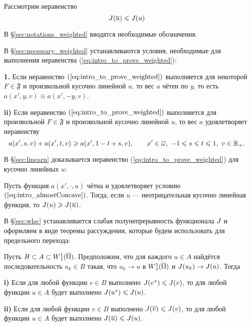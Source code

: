 Рассмотрим неравенство
\begin{equation}
\label{eq:intro_to_prove_weighted}
\IWg( \mon{u} ) \le \IWg( u )
\end{equation}

В \S\ref{sec:notations_weighted} вводятся необходимые обозначения.

В \S\ref{sec:necessary_weighted} устанавливаются условия, необходимые для выполнения неравенства (\ref{eq:intro_to_prove_weighted}):

\begin{thm}
\textbf{1.}
Если неравенство $(\ref{eq:intro_to_prove_weighted})$ выполняется для некоторой $F \in \mathfrak{F}$ и произвольной кусочно линейной $u$,
то вес $a$ чётен по $y$, то есть $a(x', y, v) \equiv a(x', -y, v)$.

\textbf{\textup{ii)}}
Если неравенство $(\ref{eq:intro_to_prove_weighted})$ выполняется для произвольной $F \in \mathfrak{F}$
и произвольной кусочно линейной $u$, то вес $a$ удовлетворяет неравенству
\begin{equation}
\label{eq:intro_almostConcave}
a(x', s, v) + a(x', t, v) \ge a(x', 1 - t + s, v), \qquad x' \in \overline{\omega},\ -1 \le s \le t \le 1,\ v \in \Real_+.
\end{equation}
\end{thm}

В \S\ref{sec:linearn} доказывается неравенство (\ref{eq:intro_to_prove_weighted}) для кусочно линейных $u$:

\begin{lm}
Пусть функция $a(x', \cdot, u)$ чётна и удовлетворяет условию $(\ref{eq:intro_almostConcave})$.
Тогда, если $u$ --- неотрицательная кусочно линейная функция, то $\IWg( u ) \ge \IWg( \mon{u} )$.
\end{lm}

В \S\ref{sec:wlsc} устанавливается слабая полунепрерывность функционала $J$
и оформляем в виде теоремы рассуждения, которые будем использовать для предельного перехода:

\begin{thm}
Пусть $B \subset A \subset \W(\overline{\Omega})$.
Предположим, что для каждого $u \in A$ найдётся последовательность $u_k \in B$ такая,
что $u_k \to u$ в $\W(\overline{\Omega})$ и $J( u_k ) \to J( u )$.
Тогда

\textbf{\textup{i)}}
Если для любой функции $v \in B$ выполнено $J( {v^*} ) \leqslant J( v )$,
то для любой функции $u \in A$ будет выполнено $J( {u^*} ) \leqslant J( u )$.

\textbf{\textup{ii)}}
Если для любой функции $v \in B$ выполнено $\IWg( \mon{v} ) \le \IWg( v )$,
то для любой функции $u \in A$ будет выполнено $\IWg( \mon{u} ) \le \IWg( u )$.
\end{thm}

